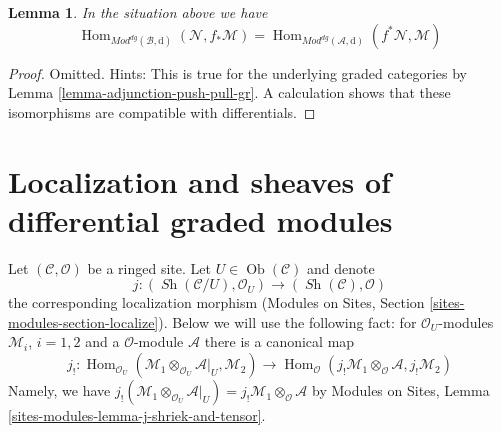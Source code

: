 \documentclass{stacks-project}
\theoremstyle{plain}
\newtheorem{lemma}[subsection]{Lemma}
\theoremstyle{definition}
\theoremstyle{remark}
\numberwithin{equation}{subsection}
\def\Hom{\mathop{\mathrm{Hom}}\nolimits}
\def\Ob{\mathop{\mathrm{Ob}}\nolimits}
\def\Sh{\mathop{\mathit{Sh}}\nolimits}
\begin{document}
\begin{lemma}
\label{lemma-adjunction-push-pull-dg}
In the situation above we have
$$
\Hom_{\textit{Mod}^{dg}(\mathcal{B}, \text{d})}(
\mathcal{N}, f_*\mathcal{M}) =
\Hom_{\textit{Mod}^{dg}(\mathcal{A}, \text{d})}(
f^*\mathcal{N}, \mathcal{M})
$$
\end{lemma}

\begin{proof}
Omitted. Hints: This is true for the underlying graded categories
by Lemma \ref{lemma-adjunction-push-pull-gr}. A calculation shows
that these isomorphisms are compatible with differentials.
\end{proof}















\section{Localization and sheaves of differential graded modules}
\label{section-localize-dg}

\noindent
Let $(\mathcal{C}, \mathcal{O})$ be a ringed site.
Let $U \in \Ob(\mathcal{C})$ and denote
$$
j :
(\Sh(\mathcal{C}/U), \mathcal{O}_U)
\longrightarrow
(\Sh(\mathcal{C}), \mathcal{O})
$$
the corresponding localization morphism
(Modules on Sites, Section \ref{sites-modules-section-localize}).
Below we will use the following fact: for $\mathcal{O}_U$-modules
$\mathcal{M}_i$, $i = 1, 2$ and a $\mathcal{O}$-module $\mathcal{A}$
there is a canonical map
$$
j_! :
\Hom_{\mathcal{O}_U}(
\mathcal{M}_1 \otimes_{\mathcal{O}_U} \mathcal{A}|_U, \mathcal{M}_2)
\longrightarrow
\Hom_\mathcal{O}(
j_!\mathcal{M}_1 \otimes_\mathcal{O} \mathcal{A}, j_!\mathcal{M}_2)
$$
Namely, we have
$j_!(\mathcal{M}_1 \otimes_{\mathcal{O}_U} \mathcal{A}|_U) =
j_!\mathcal{M}_1 \otimes_\mathcal{O} \mathcal{A}$ by
Modules on Sites, Lemma \ref{sites-modules-lemma-j-shriek-and-tensor}.
\end{document}
